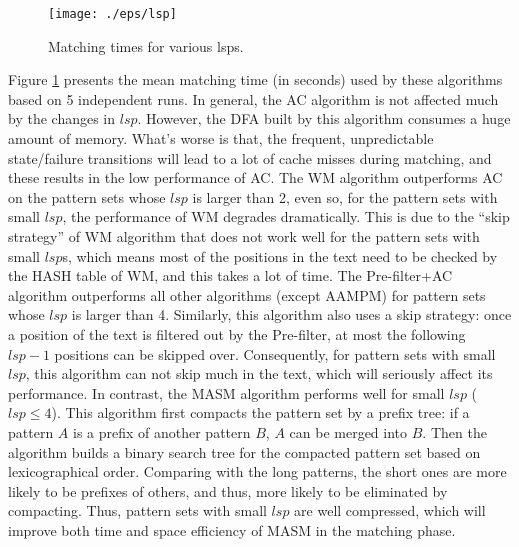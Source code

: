\documentclass{article}
\begin{document}


\begin{figure}[htbp]
  \centering
  \texttt{[image: ./eps/lsp]}
  \caption{Matching times for various lsps.}
  \label{fig:lsp}
\end{figure}

Figure \ref{fig:lsp} presents the mean matching time (in seconds) used
by these algorithms based on 5 independent runs.  In general, the
\textsf{AC} algorithm is not affected much by the changes in $lsp$.
However, the DFA built by this algorithm consumes a huge amount of
memory. What's worse is that, the frequent, unpredictable
state/failure transitions will lead to a lot of cache misses during
matching, and these results in the low performance of \textsf{AC}. The
\textsf{WM} algorithm outperforms \textsf{AC} on the pattern sets
whose $lsp$ is larger than 2, even so, for the pattern sets with small
$lsp$, the performance of \textsf{WM} degrades dramatically. This is
due to the ``skip strategy'' of \textsf{WM} algorithm that does not
work well for the pattern sets with small $lsp$s, which means most of
the positions in the text need to be checked by the HASH table of
\textsf{WM}, and this takes a lot of time. The \textsf{Pre-filter+AC}
algorithm outperforms all other algorithms (except \textsf{AAMPM}) for
pattern sets whose $lsp$ is larger than 4. Similarly, this algorithm
also uses a skip strategy: once a position of the text is filtered out
by the Pre-filter, at most the following $lsp-1$ positions can be
skipped over. Consequently, for pattern sets with small $lsp$, this
algorithm can not skip much in the text, which will seriously affect
its performance. In contrast, the \textsf{MASM} algorithm performs
well for small $lsp$ ($lsp \leq 4$). This algorithm first compacts the
pattern set by a prefix tree: if a pattern $A$ is a prefix of another
pattern $B$, $A$ can be merged into $B$. Then the algorithm builds a
binary search tree for the compacted pattern set based on
lexicographical order. Comparing with the long patterns, the short
ones are more likely to be prefixes of others, and thus, more likely
to be eliminated by compacting. Thus, pattern sets with small $lsp$
are well compressed, which will improve both time and space efficiency
of \textsf{MASM} in the matching phase.
\end{document}
